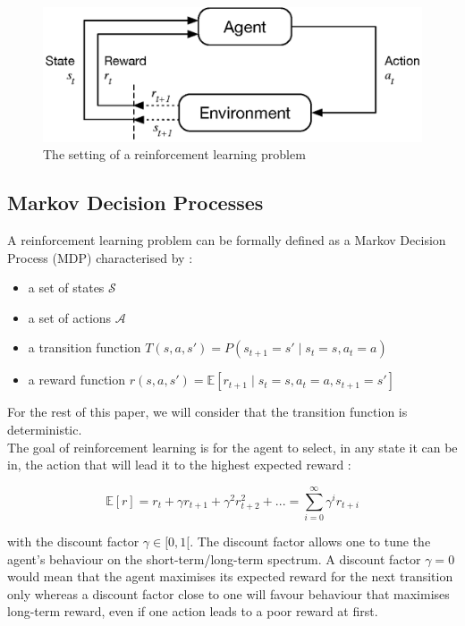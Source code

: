 \begin{figure}[]
	\centering
	\includegraphics[width=0.65\linewidth]{fig/rl.eps}
	\caption{The setting of a reinforcement learning problem 
		\cite{suttonbarto}}
	\label{fig:rl}
\end{figure}

\subsection{Markov Decision Processes}
A reinforcement learning problem can be formally defined as a Markov 
Decision Process (MDP)  characterised by :
\begin{itemize}
	\item a set of states $\mathcal{S}$
	\item a set of actions $\mathcal{A}$
	\item a transition function 
		$T(s, a, s') = P(s_{t+1} = s' \mid s_t = s, a_t = a)$
	\item a reward function 
		$r(s, a, s') = \mathbb{E}
		 [r_{t+1} \mid s_t = s, a_t = a, s_{t+1} = s']$
\end{itemize}
For the rest of this paper, we will consider that the transition function is
deterministic.\\

The goal of reinforcement learning is for the agent to select, in any state it
can be in, the action that will lead it to the highest expected reward :

\begin{equation}
\mathbb{E}[r] = r_t + \gamma r_{t+1} + \gamma^2 r_{t+2}^2 + ... =
 \sum\limits_{i=0}^\infty \gamma^i r_{t+i}
\end{equation}

\noindent with the discount factor  $\gamma \in [0, 1[$.
The discount factor allows one to tune the agent's behaviour on the
short-term/long-term spectrum. A discount factor $\gamma=0$ would mean that the
agent maximises its expected reward for the next transition only whereas a
discount factor close to one will favour behaviour that maximises long-term
reward, even if one action leads to a poor reward at first.\\

